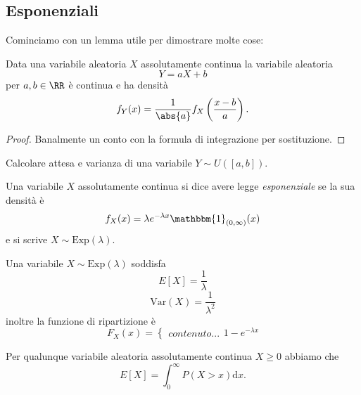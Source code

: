 \documentclass[11pt]{scrartcl}
\newcommand{\dif}{\text{d}}
\begin{document}
	\subsection{Esponenziali}
	Cominciamo con un lemma utile per dimostrare molte cose:
	\begin{lemma}
		Data una variabile aleatoria $X$ assolutamente continua la variabile aleatoria 
		$$Y=aX+b$$
		per $a,b\in \RR$ è continua e ha densità 
		$$f_Y(x)=\frac{1}{\abs{a}}f_X\left(\frac{x-b}{a}\right).$$
	\end{lemma}
	\begin{proof}
		Banalmente un conto con la formula di integrazione per sostituzione.
	\end{proof}
	\begin{example}
		Calcolare attesa e varianza di una variabile $Y\sim U([a,b])$.
	\end{example}
	\begin{definition}
		Una variabile $X$ assolutamente continua si dice avere legge \textit{esponenziale} se la sua densità è
		$$f_X(x)=\lambda e^{-\lambda x}\mathbbm{1}_{(0,\infty)}(x)$$
		e si scrive $X\sim \text{Exp}(\lambda)$.
	\end{definition}
	\begin{proposition}
		Una variabile $X\sim \text{Exp}(\lambda)$ soddisfa
		$$E\left[X\right]=\frac{1}{\lambda}$$ 
		$$\text{Var}(X)=\frac{1}{\lambda^2}$$
		inoltre la funzione di ripartizione è
		$$F_X(x)=
		\begin{cases}
			contenuto...
		\end{cases}
		1-e^{-\lambda x}$$
	\end{proposition}
	\begin{proposition}
		Per qualunque variabile aleatoria assolutamente continua $X\ge 0$ abbiamo che
		$$E\left[X\right]=\int_0^\infty P\left(X>x\right)\dif x.$$
	\end{proposition}
\end{document}
